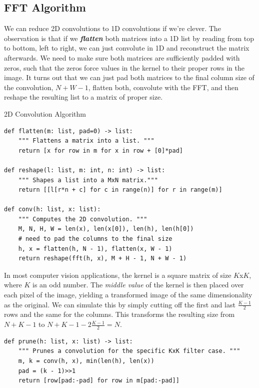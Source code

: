 \documentclass[11pt, oneside]{article}
\newcommand{\emphasis}[1]{\textbf{\textit{#1}}}
\theoremstyle{plain}
\theoremstyle{definition}
\begin{document}
\subsection{FFT Algorithm}

We can reduce 2D convolutions to 1D convolutions if we're clever.
The observation is that if we \emphasis{flatten} both matrices into a 1D list
by reading from top to bottom, left to right, we can just convolute in 1D
and reconstruct the matrix afterwards. We need to make sure both matrices
are sufficiently padded with zeros, such that the zeros force values
in the kernel to their proper rows in the image. It turns out that we can
just pad both matrices to the final column size of the convolution, 
\( N + W - 1 \), flatten both, convolute with the FFT, and then reshape the
resulting list to a matrix of proper size.
\begin{algorithm}
  \caption{2D Convolution Algorithm}
  \begin{verbatim}
def flatten(m: list, pad=0) -> list:
    """ Flattens a matrix into a list. """
    return [x for row in m for x in row + [0]*pad]

def reshape(l: list, m: int, n: int) -> list:
    """ Shapes a list into a MxN matrix."""
    return [[l[r*n + c] for c in range(n)] for r in range(m)]

def conv(h: list, x: list):
    """ Computes the 2D convolution. """
    M, N, H, W = len(x), len(x[0]), len(h), len(h[0])
    # need to pad the columns to the final size
    h, x = flatten(h, N - 1), flatten(x, W - 1)
    return reshape(fft(h, x), M + H - 1, N + W - 1)
\end{verbatim}
\end{algorithm}
In most computer vision applications, the kernel is a square matrix
of size \( K \)x\( K \), where \( K \) is an odd number.
The \textit{middle value} of the kernel is then placed over each pixel of the
image, yielding a transformed image of the same dimensionality as the original.
We can simulate this by simply cutting off the first and last
\( \frac{K - 1}{2} \) rows and the same for the columns.
This transforms the resulting size from \( N + K - 1 \) to
\( N + K - 1 - 2 \frac{K - 1}{2} = N \).

\begin{verbatim}
def prune(h: list, x: list) -> list:
    """ Prunes a convolution for the specific KxK filter case. """
    m, k = conv(h, x), min(len(h), len(x))
    pad = (k - 1)>>1
    return [row[pad:-pad] for row in m[pad:-pad]]
\end{verbatim}
\end{document}
